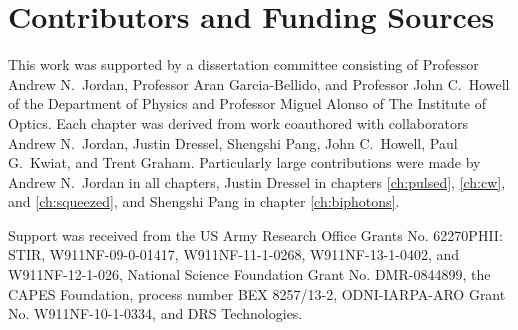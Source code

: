 \chapter*{Contributors and Funding Sources}

This work was supported by a dissertation committee consisting of Professor Andrew N.~Jordan, Professor Aran Garcia-Bellido, and Professor John C.~Howell of the Department of Physics and Professor Miguel Alonso of The Institute of Optics.  Each chapter was derived from work coauthored with collaborators Andrew N.~Jordan, Justin Dressel, Shengshi Pang, John C.~Howell, Paul G.~Kwiat, and Trent Graham.  Particularly large contributions were made by Andrew N.~Jordan in all chapters, Justin Dressel in chapters \ref{ch:pulsed}, \ref{ch:cw}, and \ref{ch:squeezed}, and Shengshi Pang in chapter \ref{ch:biphotons}.

Support was received from the US Army Research Office Grants No. 62270PHII: STIR, W911NF-09-0-01417, W911NF-11-1-0268, W911NF-13-1-0402, and W911NF-12-1-026,  National Science Foundation Grant No. DMR-0844899, the CAPES Foundation, process number BEX 8257/13-2, ODNI-IARPA-ARO Grant No. W911NF-10-1-0334, and DRS Technologies. 

